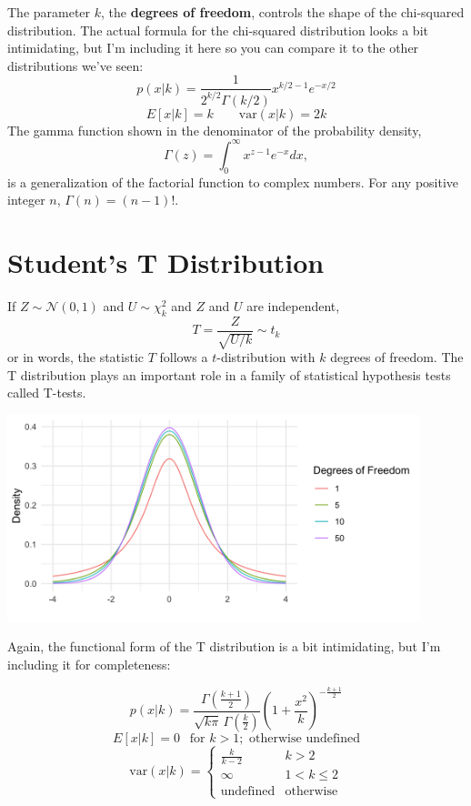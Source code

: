 The parameter $k$, the \textbf{degrees of freedom}, controls the shape of the chi-squared distribution. The actual formula for the chi-squared distribution looks a bit intimidating, but I'm including it here so you can compare it to the other distributions we've seen:
$$ p(x|k) = \frac{1}{2^{k/2} \Gamma(k/2)} x^{k/2 - 1} e^{-x/2} $$
$$ E[x | k] = k \qquad \text{var}(x | k) = 2k $$ 
The gamma function shown in the denominator of the probability density,
$$ \Gamma(z) = \int_0^{\infty} x^{z-1} e^{-x} dx, $$
is a generalization of the factorial function to complex numbers. For any positive integer $n$, $\Gamma(n) = (n-1)!$. 

\section{Student's T Distribution}

If $Z \sim \mathcal{N}(0, 1)$ and $U \sim \chi_k^2$ and $Z$ and $U$ are independent, 
$$ T = \frac{Z}{\sqrt{U/k}} \sim t_k $$
or in words, the statistic $T$ follows a $t$-distribution with $k$ degrees of freedom. The T distribution plays an important role in a family of statistical hypothesis tests called T-tests. 

\begin{center}
\includegraphics[width=0.9\textwidth]{img/hyp-example-t-distribution.png}
\end{center}

Again, the functional form of the T distribution is a bit intimidating, but I'm including it for completeness:

$$ p(x|k) = \frac{\Gamma \left(\frac{k+1}{2} \right)} {\sqrt{k\pi}\,\Gamma \left(\frac{k}{2} \right)} \left(1+\frac{x^2}{k} \right)^{-\frac{k+1}{2}} $$
$$ E[x|k] = 0~~\text{ for }k>1; \text{ otherwise undefined} $$
$$ \text{var}(x|k) = \left\{ \begin{array}{cl} \frac{k}{k-2} & k>2 \\
                                               \infty & 1 < k \leq 2 \\
                                               \text{undefined} & \text{otherwise} \end{array} \right. $$

